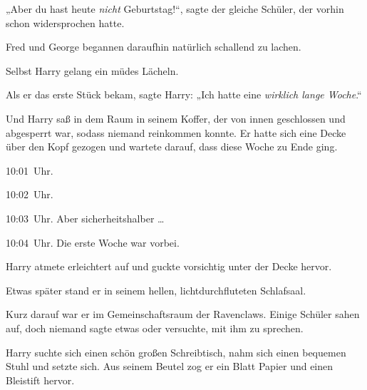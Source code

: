 „Aber du hast heute \emph{nicht} Geburtstag!“, sagte der gleiche Schüler, der vorhin schon widersprochen hatte.

Fred und George begannen daraufhin natürlich schallend zu lachen.

Selbst Harry gelang ein müdes Lächeln.

Als er das erste Stück bekam, sagte Harry:
„Ich hatte eine \emph{wirklich lange Woche}.“

\later

Und Harry saß in dem Raum in seinem Koffer, der von innen geschlossen und abgesperrt war, sodass niemand reinkommen konnte. Er hatte sich eine Decke über den Kopf gezogen und wartete darauf, dass diese Woche zu Ende ging.

10:01~Uhr.

10:02~Uhr.

10:03~Uhr. Aber sicherheitshalber …

10:04~Uhr. Die erste Woche war vorbei.

Harry atmete erleichtert auf und guckte vorsichtig unter der Decke hervor.

Etwas später stand er in seinem hellen, lichtdurchfluteten Schlafsaal.

Kurz darauf war er im Gemeinschaftsraum der Ravenclaws. Einige Schüler sahen auf, doch niemand sagte etwas oder versuchte, mit ihm zu sprechen.

Harry suchte sich einen schön großen Schreibtisch, nahm sich einen bequemen Stuhl und setzte sich. Aus seinem Beutel zog er ein Blatt Papier und einen Bleistift hervor.


